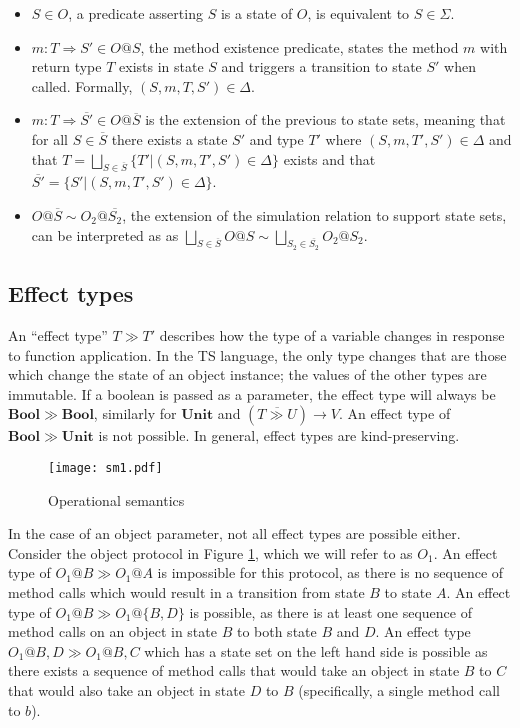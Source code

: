 \documentclass[preprint]{sigplanconf}
\newcommand{\figref}[1]{Figure \ref{#1}}
\newcommand{\unitt}{\mathbf{Unit}}
\newcommand{\boolt}{\mathbf{Bool}}
\newcommand{\funt}[3]{(\overline{#1 \gg #2}) \rightarrow #3}
\begin{document}
\begin{itemize}
\item $S \in O$, a predicate asserting $S$ is a state of $O$, is equivalent to
$S \in \Sigma$.
\item $m : T \Rightarrow S' \in O@S$, the method existence predicate, 
states the method $m$ with return type $T$ exists in state $S$ and triggers a 
transition to state $S'$ when called. Formally, $(S,m,T,S') \in \Delta$.
\item $m : T \Rightarrow \overline{S'} \in O@\overline{S}$ is the extension
of the previous to state sets, meaning that for all $S \in \overline{S}$
there exists a state $S'$ and type $T'$ where 
$(S,m,T',S') \in \Delta$ and that
$T = \bigsqcup_{S \in \overline{S}} \{ T' | (S,m,T',S') \in \Delta \}$ exists
and that $\overline{S'} = \{ S' | (S,m,T',S') \in \Delta \}$.
\item $O@\overline{S} \sim O_2@\overline{S_2}$, the extension of the
simulation relation to support state sets, can be interpreted as
as $\bigsqcup_{S \in \overline{S}}O@S \sim \bigsqcup_{S_2 \in \overline{S_2}}O_2@S_2$.
\end{itemize}

\subsection{Effect types}

An ``effect type'' $T \gg T'$ describes how the type of a variable changes
in response to function application. In the TS language, the only type
changes that are those which change the state of an object instance; the
values of the other types are immutable. If a boolean is passed as a parameter,
the effect type will always be $\boolt \gg \boolt$, similarly for
$\unitt$ and $\funt{T}{U}{V}$. An effect type of $\boolt \gg \unitt$ is not
possible. In general, effect types are kind-preserving.

\begin{figure}
\texttt{[image: sm1.pdf]}
\caption{\label{fig:sm1} Operational semantics}
\end{figure}

In the case of an object parameter, not all effect types are possible
either. Consider
the object protocol in \figref{fig:sm1}, which we will refer to as $O_1$.
An effect type of $O_1@B \gg O_1@A$ is impossible for this protocol, as there
is no sequence of method calls which would result in a transition from state
$B$ to state $A$. An effect type of $O_1@B \gg O_1@\{B,D\}$ is possible, 
as there is at least one sequence of method calls on an object in
state $B$ to both state $B$ and $D$.
An effect type $O_1@{B,D} \gg O_1@{B,C}$ which has a state set on
the left hand side is possible as there exists a sequence of method calls 
that would take an object in state $B$ to $C$ that would also
take an object in state $D$ to $B$ (specifically, a single method
call to $b$).
\end{document}
